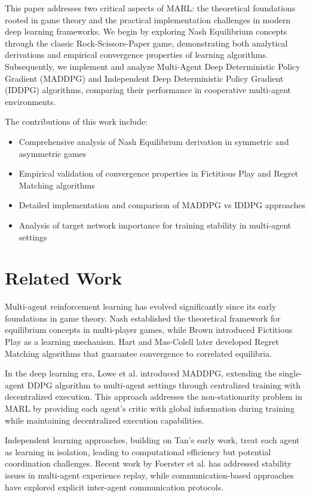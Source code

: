 \documentclass[conference]{IEEEtran}
\begin{document}
This paper addresses two critical aspects of MARL: the theoretical foundations rooted in game theory and the practical implementation challenges in modern deep learning frameworks. We begin by exploring Nash Equilibrium concepts through the classic Rock-Scissors-Paper game, demonstrating both analytical derivations and empirical convergence properties of learning algorithms. Subsequently, we implement and analyze Multi-Agent Deep Deterministic Policy Gradient (MADDPG) and Independent Deep Deterministic Policy Gradient (IDDPG) algorithms, comparing their performance in cooperative multi-agent environments.

The contributions of this work include:
\begin{itemize}
    \item Comprehensive analysis of Nash Equilibrium derivation in symmetric and asymmetric games
    \item Empirical validation of convergence properties in Fictitious Play and Regret Matching algorithms
    \item Detailed implementation and comparison of MADDPG vs IDDPG approaches
    \item Analysis of target network importance for training stability in multi-agent settings
\end{itemize}

\section{Related Work}

Multi-agent reinforcement learning has evolved significantly since its early foundations in game theory. Nash \cite{nash1950equilibrium} established the theoretical framework for equilibrium concepts in multi-player games, while Brown \cite{brown1951iterative} introduced Fictitious Play as a learning mechanism. Hart and Mas-Colell \cite{hart2000simple} later developed Regret Matching algorithms that guarantee convergence to correlated equilibria.

In the deep learning era, Lowe et al. \cite{lowe2017multi} introduced MADDPG, extending the single-agent DDPG algorithm \cite{lillicrap2015continuous} to multi-agent settings through centralized training with decentralized execution. This approach addresses the non-stationarity problem in MARL by providing each agent's critic with global information during training while maintaining decentralized execution capabilities.

Independent learning approaches, building on Tan's \cite{tan1993multi} early work, treat each agent as learning in isolation, leading to computational efficiency but potential coordination challenges. Recent work by Foerster et al. \cite{foerster2018stabilising} has addressed stability issues in multi-agent experience replay, while communication-based approaches \cite{foerster2016learning} have explored explicit inter-agent communication protocols.
\end{document}
